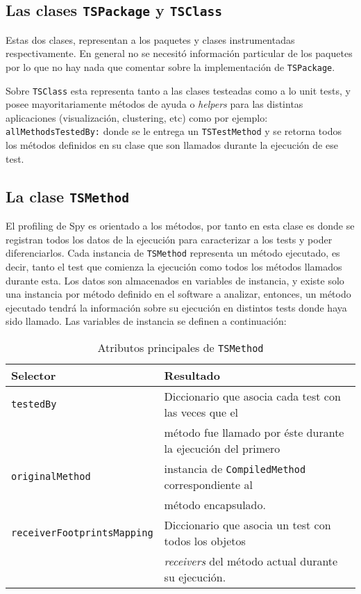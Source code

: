 \subsection{Las clases {\tt TSPackage} y {\tt TSClass}}

\par Estas dos clases, representan a los paquetes y clases instrumentadas respectivamente. En general no se necesitó información particular de los paquetes por lo que no hay nada que comentar sobre la implementación de {\tt TSPackage}.

\par Sobre {\tt TSClass} esta representa tanto a las clases testeadas como a lo unit tests, y posee mayoritariamente métodos de ayuda o \emph{helpers} para las distintas aplicaciones (visualización, clustering, etc) como por ejemplo: {\tt allMethodsTestedBy:} donde se le entrega un {\tt TSTestMethod} y se retorna todos los métodos definidos en su clase que son llamados durante la ejecución de ese test.  

\subsection{La clase {\tt TSMethod} }
\par El profiling de Spy es orientado a los métodos, por tanto en esta clase es donde se registran todos los datos de la ejecución para caracterizar a los tests y poder diferenciarlos. Cada instancia de {\tt TSMethod} representa un método ejecutado, es decir, tanto el test que comienza la ejecución como todos los métodos llamados durante esta. Los datos son almacenados en variables de instancia, y existe solo una instancia por método definido en el software a analizar, entonces, un método ejecutado tendrá la información sobre su ejecución en distintos tests donde haya sido llamado. Las variables de instancia se definen a continuación:

\begin{table}[h] 
    \centering 
    \begin{tabular}{|l|l|}
    	\hline
\textbf{Selector} & \textbf{Resultado} \\ \hline \hline
{\tt testedBy}	& Diccionario que asocia cada test con las veces que el \\
				& método fue llamado por éste durante la ejecución del primero\\ \hline
{\tt originalMethod} & instancia de {\tt CompiledMethod} correspondiente al  \\
						& método encapsulado. \\ \hline
{\tt receiverFootprintsMapping} & Diccionario que asocia un test con todos los objetos \\
						& \emph{receivers} del método actual durante su ejecución. \\ \hline
    \end{tabular}
    \caption{Atributos principales de {\tt TSMethod}}
\end{table} 

